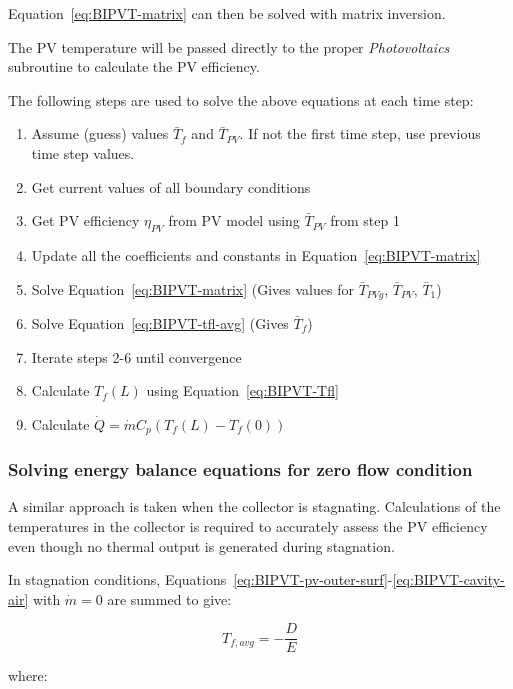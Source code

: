 Equation~\ref{eq:BIPVT-matrix} can then be solved with matrix inversion.

The PV temperature will be passed directly to the proper \emph{Photovoltaics} subroutine to calculate the PV efficiency.

The following steps are used to solve the above equations at each time step:

\begin{enumerate}
	\item Assume (guess) values \(\bar{T}_{f}\) and \(\bar{T}_{PV}\). If not the first time step, use previous time step values.
	\item Get current values of all boundary conditions
	\item Get PV efficiency \(\eta_{PV}\) from PV model using \(\bar{T}_{PV}\) from step 1
	\item Update all the coefficients and constants in Equation~\ref{eq:BIPVT-matrix}
	\item Solve Equation~\ref{eq:BIPVT-matrix} (Gives values for \(\bar{T}_{PVg}\), \(\bar{T}_{PV}\), \(\bar{T}_{1}\))
	\item Solve Equation~\ref{eq:BIPVT-tfl-avg} (Gives \(\bar{T}_{f}\))
	\item Iterate steps 2-6 until convergence
	\item Calculate \(T_{f}(L)\) using Equation~\ref{eq:BIPVT-Tfl}
	\item Calculate \(\dot{Q}=\dot{m}C_{p}\left(T_{f}(L)-T_{f}(0)\right)\)
\end{enumerate}

\subsubsection{Solving energy balance equations for zero flow condition}\label{BIPVT-solving-zero-flow}

A similar approach is taken when the collector is stagnating. Calculations of the temperatures in the collector is required to accurately assess the PV efficiency even though no thermal output is generated during stagnation.

In stagnation conditions, Equations~\ref{eq:BIPVT-pv-outer-surf}-\ref{eq:BIPVT-cavity-air} with \(\dot{m}=0\) are summed to give:

\begin{equation}
T_{f,avg}=-\frac{D}{E}
\label{eq:BIPVT-Tfavg}
\end{equation}

where:

